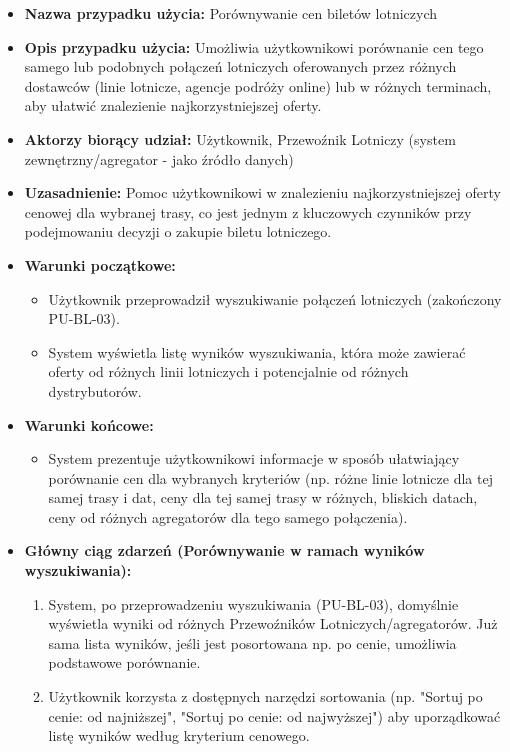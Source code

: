 \documentclass[a4paper,12pt]{article}
\begin{document}
\begin{itemize}
    \item \textbf{Nazwa przypadku użycia:} Porównywanie cen biletów lotniczych
    \item \textbf{Opis przypadku użycia:} Umożliwia użytkownikowi porównanie cen tego samego lub podobnych połączeń lotniczych oferowanych przez różnych dostawców (linie lotnicze, agencje podróży online) lub w różnych terminach, aby ułatwić znalezienie najkorzystniejszej oferty.
    \item \textbf{Aktorzy biorący udział:} Użytkownik, Przewoźnik Lotniczy (system zewnętrzny/agregator - jako źródło danych)
    \item \textbf{Uzasadnienie:} Pomoc użytkownikowi w znalezieniu najkorzystniejszej oferty cenowej dla wybranej trasy, co jest jednym z kluczowych czynników przy podejmowaniu decyzji o zakupie biletu lotniczego.
    \item \textbf{Warunki początkowe:}
        \begin{itemize}
            \item Użytkownik przeprowadził wyszukiwanie połączeń lotniczych (zakończony PU-BL-03).
            \item System wyświetla listę wyników wyszukiwania, która może zawierać oferty od różnych linii lotniczych i potencjalnie od różnych dystrybutorów.
        \end{itemize}
    \item \textbf{Warunki końcowe:}
        \begin{itemize}
            \item System prezentuje użytkownikowi informacje w sposób ułatwiający porównanie cen dla wybranych kryteriów (np. różne linie lotnicze dla tej samej trasy i dat, ceny dla tej samej trasy w różnych, bliskich datach, ceny od różnych agregatorów dla tego samego połączenia).
        \end{itemize}
    \item \textbf{Główny ciąg zdarzeń (Porównywanie w ramach wyników wyszukiwania):}
        \begin{enumerate}
            \item System, po przeprowadzeniu wyszukiwania (PU-BL-03), domyślnie wyświetla wyniki od różnych Przewoźników Lotniczych/agregatorów. Już sama lista wyników, jeśli jest posortowana np. po cenie, umożliwia podstawowe porównanie.
            \item Użytkownik korzysta z dostępnych narzędzi sortowania (np. "Sortuj po cenie: od najniższej", "Sortuj po cenie: od najwyższej") aby uporządkować listę wyników według kryterium cenowego.

\end{enumerate}
\end{itemize}
\end{document}
